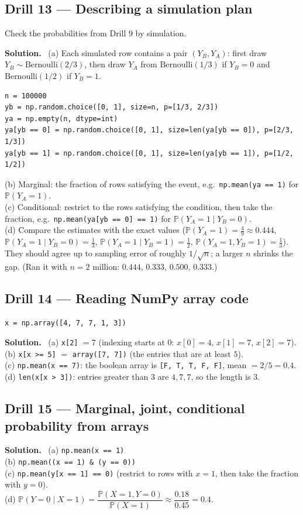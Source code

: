 \documentclass[11pt]{article}
\renewcommand{\P}{\mathbb{P}}
\newcommand{\Bern}{\text{Bernoulli}}
\newcommand{\py}[1]{\texttt{#1}}
\newenvironment{soln}{\par\smallskip\noindent\textbf{Solution.}\ }{\par\medskip}
\begin{document}
\subsection*{Drill 13 --- Describing a simulation plan}
Check the probabilities from Drill 9 by simulation.
\begin{soln}
(a) Each simulated row contains a pair $(Y_B,Y_A)$: first draw $Y_B\sim\Bern(2/3)$, then draw $Y_A$ from $\Bern(1/3)$ if $Y_B=0$ and $\Bern(1/2)$ if $Y_B=1$.
\begin{lstlisting}
n = 100000
yb = np.random.choice([0, 1], size=n, p=[1/3, 2/3])
ya = np.empty(n, dtype=int)
ya[yb == 0] = np.random.choice([0, 1], size=len(ya[yb == 0]), p=[2/3, 1/3])
ya[yb == 1] = np.random.choice([0, 1], size=len(ya[yb == 1]), p=[1/2, 1/2])
\end{lstlisting}
(b) Marginal: the fraction of rows satisfying the event, e.g.\ \py{np.mean(ya == 1)} for $\P(Y_A{=}1)$.\\
(c) Conditional: restrict to the rows satisfying the condition, then take the fraction, e.g.\ \py{np.mean(ya[yb == 0] == 1)} for $\P(Y_A{=}1\mid Y_B{=}0)$.\\
(d) Compare the estimates with the exact values ($\P(Y_A{=}1)=\frac49\approx0.444$, $\P(Y_A{=}1\mid Y_B{=}0)=\frac13$, $\P(Y_A{=}1\mid Y_B{=}1)=\frac12$, $\P(Y_A{=}1,Y_B{=}1)=\frac13$). They should agree up to sampling error of roughly $1/\sqrt n$; a larger $n$ shrinks the gap. (Ran it with $n=2$ million: $0.444$, $0.333$, $0.500$, $0.333$.)
\end{soln}

\subsection*{Drill 14 --- Reading NumPy array code}
\py{x = np.array([4, 7, 7, 1, 3])}
\begin{soln}
(a) \py{x[2]} $=7$ (indexing starts at $0$: $x[0]=4$, $x[1]=7$, $x[2]=7$).\\
(b) \py{x[x >= 5]} $=$ \py{array([7, 7])} (the entries that are at least $5$).\\
(c) \py{np.mean(x == 7)}: the boolean array is \py{[F, T, T, F, F]}, mean $=2/5=0.4$.\\
(d) \py{len(x[x > 3])}: entries greater than $3$ are $4,7,7$, so the length is $3$.
\end{soln}

\subsection*{Drill 15 --- Marginal, joint, conditional probability from arrays}
\begin{soln}
(a) \py{np.mean(x == 1)}\\
(b) \py{np.mean((x == 1) \& (y == 0))}\\
(c) \py{np.mean(y[x == 1] == 0)} (restrict to rows with $x=1$, then take the fraction with $y=0$).\\
(d) $\P(Y{=}0\mid X{=}1)=\dfrac{\P(X{=}1,Y{=}0)}{\P(X{=}1)}\approx\dfrac{0.18}{0.45}=0.4$.
\end{soln}
\end{document}
